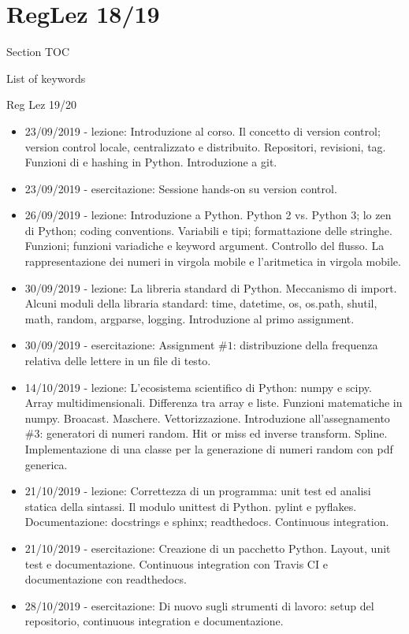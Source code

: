 \section{RegLez 18/19}

\begin{frame}[allowframebreaks]{Section TOC}
\tableofcontents[currentsection,sectionstyle=show/hide,subsectionstyle=show/show/hide]%
\end{frame}

\begin{frame}[allowframebreaks]{List of keywords}
\listofkeywords
\end{frame}

\begin{frame}[allowframebreaks]{Reg Lez 19/20}

\begin{itemize}
\item 23/09/2019 - lezione: Introduzione al corso. Il concetto di version control; version control locale, centralizzato e distribuito. Repositori, revisioni, tag. Funzioni di  e hashing in Python. Introduzione a git.
\item 23/09/2019 - esercitazione: Sessione hands-on su version control.
\item 26/09/2019 - lezione: Introduzione a Python. Python 2 vs. Python 3; lo zen di Python; coding conventions. Variabili e tipi; formattazione delle stringhe. Funzioni; funzioni variadiche e keyword argument. Controllo del flusso. La rappresentazione dei numeri in virgola mobile e l'aritmetica in virgola mobile.
\item 30/09/2019 - lezione: La libreria standard di Python. Meccanismo di import. Alcuni moduli della libraria standard: time, datetime, os, os.path, shutil, math, random, argparse, logging. Introduzione al primo assignment.
\item 30/09/2019 - esercitazione: Assignment $\#1$: distribuzione della frequenza relativa delle lettere in un file di testo.
\item 14/10/2019 - lezione: L'ecosistema scientifico di Python: numpy e scipy. Array multidimensionali. Differenza tra array e liste. Funzioni matematiche in numpy. Broacast. Maschere. Vettorizzazione. Introduzione all'assegnamento $\#3$: generatori di numeri random. Hit or miss ed inverse transform. Spline. Implementazione di una classe per la generazione di numeri random con pdf generica.
\item 21/10/2019 - lezione: Correttezza di un programma: unit test ed analisi statica della sintassi. Il modulo unittest di Python. pylint e pyflakes. Documentazione: docstrings e sphinx; readthedocs. Continuous integration.
\item 21/10/2019 - esercitazione: Creazione di un pacchetto Python. Layout, unit test e documentazione. Continuous integration con Travis CI e documentazione con readthedocs.
\item 28/10/2019 - esercitazione: Di nuovo sugli strumenti di lavoro: setup del repositorio, continuous integration e documentazione.
\end{itemize}


\end{frame}
